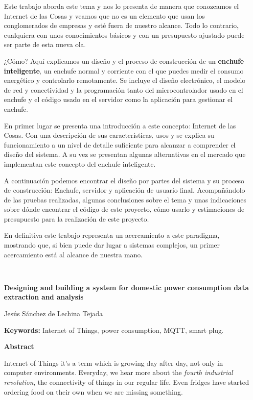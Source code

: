 \documentclass[a4paper,10pt]{article}
\begin{document}
\begin{titlepage}
Este trabajo aborda este tema y nos lo presenta de manera que
conozcamos el Internet de las Cosas y veamos que no es un elemento que
usan los conglomerados de empresas y esté fuera de nuestro
alcance. Todo lo contrario, cualquiera con unos conocimientos básicos
y con un presupuesto ajustado puede ser parte de esta nueva ola.

¿Cómo? Aquí explicamos un diseño y el proceso de construcción de un
\textbf{enchufe inteligente}, un enchufe normal y corriente con el que
puedes medir el consumo energético y controlarlo remotamente. Se
incluye el diseño electrónico, el modelo de red y conectividad y la
programación tanto del microcontrolador usado en el enchufe y el
código usado en el servidor como la aplicación para gestionar el
enchufe.

En primer lugar se presenta una introducción a este concepto: Internet
de las Cosas. Con una descripción de sus características, usos y se
explica su funcionamiento a un nivel de detalle suficiente para
alcanzar a comprender el diseño del sistema. A su vez se presentan
algunas alternativas en el mercado que implementan este concepto del
enchufe inteligente.

A continuación podemos encontrar el diseño por partes del sistema y su
proceso de construcción: Enchufe, servidor y aplicación de usuario
final. Acompañándolo de las pruebas realizadas, algunas conclusiones
sobre el tema y unas indicaciones sobre dónde encontrar el código de
este proyecto, cómo usarlo y estimaciones de presupuesto para la
realización de este proyecto.

En definitiva este trabajo representa un acercamiento a este
paradigma, mostrando que, si bien puede dar lugar a sistemas
complejos, un primer acercamiento está al alcance de nuestra mano.

\thispagestyle{empty}

\newpage

\ 
\thispagestyle{empty}

\newpage

\begin{center}
\textbf{Designing and building a system for domestic power consumption
  data extraction and analysis}


Jesús Sánchez de Lechina Tejada
\end{center}

\textbf{Keywords:} Internet of Things, power consumption, MQTT, smart
plug.

\textbf{Abstract}

Internet of Things it's a term which is growing day after day, not
only in computer environments. Everyday, we hear more about the
\emph{fourth industrial revolution}, the connectivity of things in our
regular life. Even fridges have started ordering food on their own
when we are missing something.


\end{titlepage}
\end{document}
